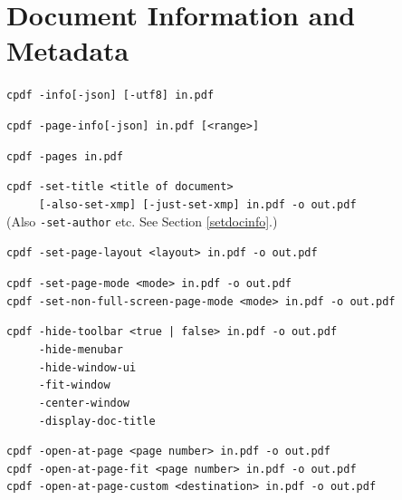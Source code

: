 \documentclass{book}
\begin{document}
\chapter{Document Information and Metadata}\label{chap:11}
  \begin{framed}

    \small\noindent\verb!cpdf -info[-json] [-utf8] in.pdf!

    \vspace{1.5mm}
    \small\noindent\verb!cpdf -page-info[-json] in.pdf [<range>]!

    \vspace{1.5mm}
    \small\noindent\verb!cpdf -pages in.pdf!

    \vspace{1.5mm}
    \small\noindent\verb!cpdf -set-title <title of document>!\\
    \small\noindent\verb!     [-also-set-xmp] [-just-set-xmp] in.pdf -o out.pdf!\\
    (Also \texttt{-set-author} etc. See Section \ref{setdocinfo}.)

    \vspace{1.5mm}
    \small\noindent\verb!cpdf -set-page-layout <layout> in.pdf -o out.pdf!

    \vspace{1.5mm}
    \small\noindent\verb!cpdf -set-page-mode <mode> in.pdf -o out.pdf!\\
    \small\noindent\verb!cpdf -set-non-full-screen-page-mode <mode> in.pdf -o out.pdf!

    \vspace{1.5mm} 
    \small\noindent\verb!cpdf -hide-toolbar <true | false> in.pdf -o out.pdf!\\
    \noindent\verb!     -hide-menubar!\\
    \noindent\verb!     -hide-window-ui!\\
    \noindent\verb!     -fit-window!\\
    \noindent\verb!     -center-window!\\
    \noindent\verb!     -display-doc-title!
    
    \vspace{1.5mm}
    \small\noindent\verb!cpdf -open-at-page <page number> in.pdf -o out.pdf!\\
    \noindent\verb!cpdf -open-at-page-fit <page number> in.pdf -o out.pdf!\\
    \noindent\verb!cpdf -open-at-page-custom <destination> in.pdf -o out.pdf!


\end{framed}
\end{document}
